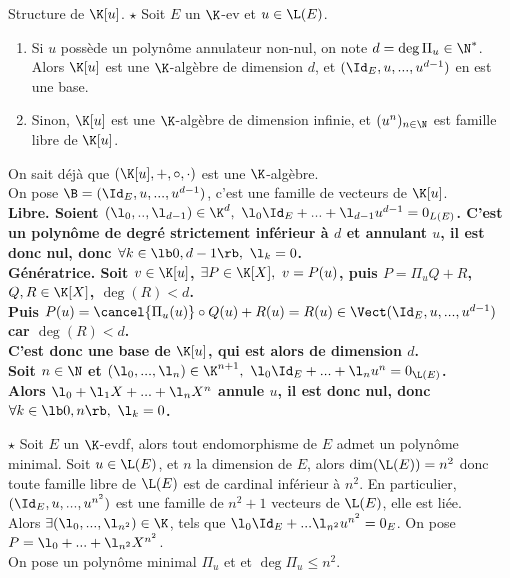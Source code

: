 \documentclass[11pt]{article}
\begin{document}
\begin{prop}{Structure de $\K[u]$. $\star$}{}
    Soit $E$ un $\K$-ev et $u\in\L(E)$.
    \begin{enumerate}
        \item Si $u$ possède un polynôme annulateur non-nul, on note $d=\deg \Pi_u\in\N^*$.\\
        Alors $\K[u]$ est une $\K$-algèbre de dimension $d$, et $(\Id_E, u, ..., u^{d-1})$ en est une base.
        \item Sinon, $\K[u]$ est une $\K$-algèbre de dimension infinie, et $(u^n)_{n\in\N}$ est famille libre de $\K[u]$.
    \end{enumerate}
    \tcblower
     On sait déjà que $(\K[u],+,\circ,\cdot)$ est une $\K$-algèbre.\\
    On pose $\B=(\Id_E,u,...,u^{d-1})$, c'est une famille de vecteurs de $\K[u]$.\\
    \bf{Libre.} Soient $(\l_0,..,\l_{d-1})\in\K^d, ~ \l_0\Id_E+...+\l_{d-1}u^{d-1}=0_{L(E)}$. C'est un polynôme de degré strictement inférieur à $d$ et annulant $u$, il est donc nul, donc $\forall k \in \lb0,d-1\rb, ~ \l_k=0$.\\
    \bf{Génératrice.} Soit $v\in\K[u]$, $\exists P \in \K[X], ~ v=P(u)$, puis $P=\Pi_uQ + R$, ~ $Q,R\in\K[X]$, $\deg(R)<d$.\\
    Puis $P(u)=\cancel{\Pi_u(u)}\circ Q(u) + R(u) = R(u) \in \Vect(\Id_E,u,...,u^{d-1})$ car $\deg(R)<d$.\\
    C'est donc une base de $\K[u]$, qui est alors de dimension $d$.\\
     Soit $n\in\N$ et $(\l_0,...,\l_n)\in\K^{n+1}, ~ \l_0\Id_E+...+\l_n u^n = 0_{\L(E)}$.\\
    Alors $\l_0 + \l_1 X + ... + \l_n X^n$ annule $u$, il est donc nul, donc $\forall k \in \lb0,n\rb, ~ \l_k=0$.
\end{prop}

\begin{prop}{$\star$}{}
    Soit $E$ un $\K$-evdf, alors tout endomorphisme de $E$ admet un polynôme minimal.
    \tcblower
    Soit $u\in\L(E)$, et $n$ la dimension de $E$, alors $\dim(\L(E))=n^2$ donc toute famille libre de $\L(E)$ est de cardinal inférieur à $n^2$.
    En particulier, $(\Id_E, u, ..., u^{n^2})$ est une famille de $n^2+1$ vecteurs de $\L(E)$, elle est liée.\\
    Alors $\exists (\l_0,...,\l_{n^2})\in\K$, tels que $\l_0\Id_E+...\l_{n^2}u^{n^2}=0_E$. On pose $P=\l_0 + ... + \l_{n^2}X^{n^2}$.\\
    On pose un polynôme minimal $\Pi_u$ et et $\deg \Pi_u \leq n^2$.
\end{prop}
\end{document}
